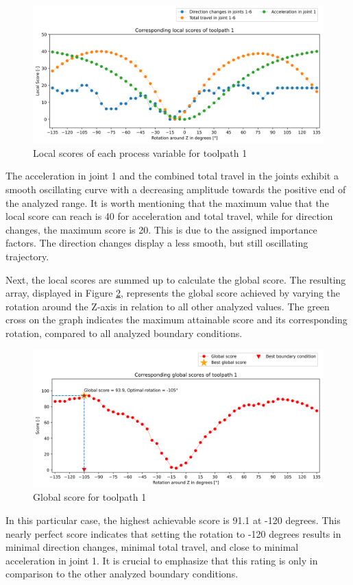\begin{figure}[H]
	\centerline{\includegraphics[width=1\textwidth]{figures/LocalScores_1.png}}
	\caption{Local scores of each process variable for toolpath 1}
	\label{LS1}
\end{figure}
\newpage
The acceleration in joint 1 and the combined total travel in the joints exhibit a smooth oscillating curve with a decreasing amplitude towards the positive end of the analyzed range. It is worth mentioning that the maximum value that the local score can reach is 40 for acceleration and total travel, while for direction changes, the maximum score is 20. This is due to the assigned importance factors. The direction changes display a less smooth, but still oscillating trajectory.

Next, the local scores are summed up to calculate the global score. The resulting array, displayed in Figure \ref{GS1}, represents the global score achieved by varying the rotation around the Z-axis in relation to all other analyzed values. The green cross on the graph indicates the maximum attainable score and its corresponding rotation, compared to all analyzed boundary conditions.

\begin{figure}[H]
	\centerline{\includegraphics[width=1\textwidth]{figures/best_c_1.png}}
	\caption{Global score for toolpath 1}
	\label{GS1}
\end{figure}
In this particular case, the highest achievable score is 91.1 at -120 degrees. This nearly perfect score indicates that setting the rotation to -120 degrees results in minimal direction changes, minimal total travel, and close to minimal acceleration in joint 1. It is crucial to emphasize that this rating is only in comparison to the other analyzed boundary conditions.

